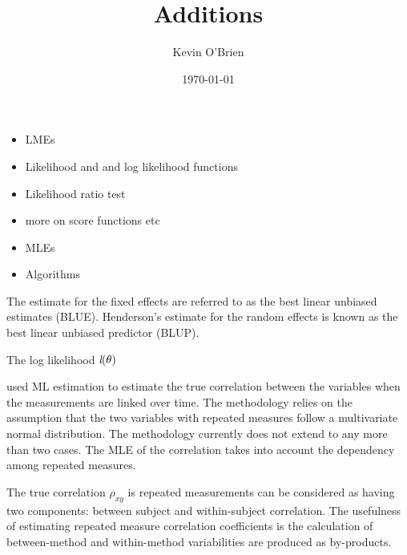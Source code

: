 \documentclass[12pt, a4paper]{report}
\begin{document}
\author{Kevin O'Brien}
\title{Additions}
\date{\today}
\maketitle

\tableofcontents \setcounter{tocdepth}{2}

\begin{itemize}
\item LMEs
\item Likelihood and and log likelihood functions
\item Likelihood ratio test
\item more on score functions etc
\item MLEs
\item Algorithms

\end{itemize}

The estimate for the fixed effects are referred to as the best linear unbiased estimates (BLUE). Henderson's estimate for the random effects is known as the best linear unbiased predictor (BLUP).


The log likelihood $\emph{l}(\theta)$

\newpage
\citet{Lam} used ML estimation to estimate the true correlation between the variables when
the measurements are linked over time. The methodology relies on the assumption that the two variables with repeated measures follow a multivariate normal distribution. The methodology currently does not extend to any more than two cases. The MLE of the correlation takes into account the dependency among repeated measures.

The true correlation $\rho_{xy}$ is repeated measurements can be considered as having two components: between subject and within-subject correlation. The usefulness of estimating repeated measure correlation coefficients is the calculation of between-method and within-method variabilities are produced as by-products.
\end{document}
